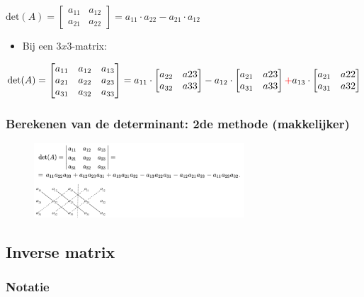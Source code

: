 \documentclass{article}
\begin{document}
$\text{det}(A) = \begin{bmatrix}
a_{11} & a_{12}\\
a_{21} & a_{22}
\end{bmatrix} = a_{11} \cdot a_{22} - a_{21}\cdot a_{12}$

\begin{itemize}
    \item Bij een $3x3$-matrix:
\end{itemize}

$\text{det}(A) = \begin{bmatrix}
a_{11} & a_{12} & a_{13}\\
a_{21} & a_{22} & a_{23}\\
a_{31} & a_{32} & a_{33}
\end{bmatrix} = a_{11} \cdot 
\begin{bmatrix}
a_{22} & a{23}\\
a_{32} & a{33}
\end{bmatrix} - a_{12} \cdot 
\begin{bmatrix}
a_{21} & a{23}\\
a_{31} & a{33}
\end{bmatrix} \textcolor{red}{+}  a_{13} \cdot 
\begin{bmatrix}
a_{21} & a{22}\\
a_{31} & a{32}
\end{bmatrix}
$

\subsubsection{Berekenen van de determinant: 2de methode (makkelijker)}

\begin{figure}[H]
    \centering
    \includegraphics[width=0.7\textwidth]{3x3-matrix-determinant.png}
\end{figure}


\subsection{Inverse matrix}

\subsubsection{Notatie}
\end{document}
